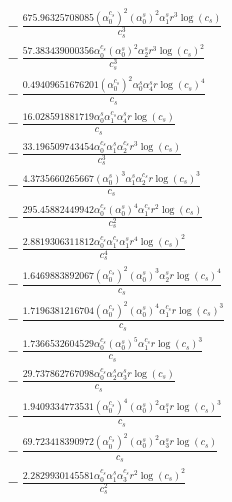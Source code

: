 \documentclass[10pt]{article}
\begin{document}
\begin{align*}
&{}  - \frac{675.96325708085 \left(\alpha_{0}^{c_s}\right)^{2} \left(\alpha_{0}^s\right)^{2} \alpha_{1}^s r^{3} \log{\left(c_{s} \right)}}{c_{s}^{3}} \\
&{}  - \frac{57.383439000356 \alpha_{0}^{c_s} \left(\alpha_{0}^s\right)^{2} \alpha_{2}^s r^{3} \log{\left(c_{s} \right)}^{2}}{c_{s}^{3}} \\
&{}  - \frac{0.49409651676201 \left(\alpha_{0}^{c_s}\right)^{2} \alpha_{0}^s \alpha_{4}^s r \log{\left(c_{s} \right)}^{4}}{c_{s}} \\
&{}  - \frac{16.028591881719 \alpha_{0}^s \alpha_{1}^{c_s} \alpha_{4}^s r \log{\left(c_{s} \right)}}{c_{s}} \\
&{}  - \frac{33.196509743454 \alpha_{0}^{c_s} \alpha_{1}^s \alpha_{2}^{c_s} r^{3} \log{\left(c_{s} \right)}}{c_{s}^{3}} \\
&{}  - \frac{4.3735660265667 \left(\alpha_{0}^s\right)^{3} \alpha_{1}^s \alpha_{2}^{c_s} r \log{\left(c_{s} \right)}^{3}}{c_{s}} \\
&{}  - \frac{295.45882449942 \alpha_{0}^{c_s} \left(\alpha_{0}^s\right)^{4} \alpha_{1}^{c_s} r^{2} \log{\left(c_{s} \right)}}{c_{s}^{2}} \\
&{}  - \frac{2.8819306311812 \alpha_{0}^{c_s} \alpha_{1}^{c_s} \alpha_{1}^s r^{4} \log{\left(c_{s} \right)}^{2}}{c_{s}^{4}} \\
&{}  - \frac{1.6469883892067 \left(\alpha_{0}^{c_s}\right)^{2} \left(\alpha_{0}^s\right)^{3} \alpha_{2}^s r \log{\left(c_{s} \right)}^{4}}{c_{s}} \\
&{}  - \frac{1.7196381216704 \left(\alpha_{0}^{c_s}\right)^{2} \left(\alpha_{0}^s\right)^{4} \alpha_{1}^{c_s} r \log{\left(c_{s} \right)}^{3}}{c_{s}} \\
&{}  - \frac{1.7366532604529 \alpha_{0}^{c_s} \left(\alpha_{0}^s\right)^{5} \alpha_{1}^{c_s} r \log{\left(c_{s} \right)}^{3}}{c_{s}} \\
&{}  - \frac{29.737862767098 \alpha_{0}^{c_s} \alpha_{2}^s \alpha_{3}^s r \log{\left(c_{s} \right)}}{c_{s}} \\
&{}  - \frac{1.9409334773531 \left(\alpha_{0}^{c_s}\right)^{4} \left(\alpha_{0}^s\right)^{2} \alpha_{1}^s r \log{\left(c_{s} \right)}^{3}}{c_{s}} \\
&{}  - \frac{69.723418390972 \left(\alpha_{0}^{c_s}\right)^{2} \left(\alpha_{0}^s\right)^{2} \alpha_{3}^s r \log{\left(c_{s} \right)}}{c_{s}} \\
&{}  - \frac{2.2829930145581 \alpha_{0}^{c_s} \alpha_{1}^s \alpha_{3}^{c_s} r^{2} \log{\left(c_{s} \right)}^{2}}{c_{s}^{2}} \\

\end{align*}
\end{document}
